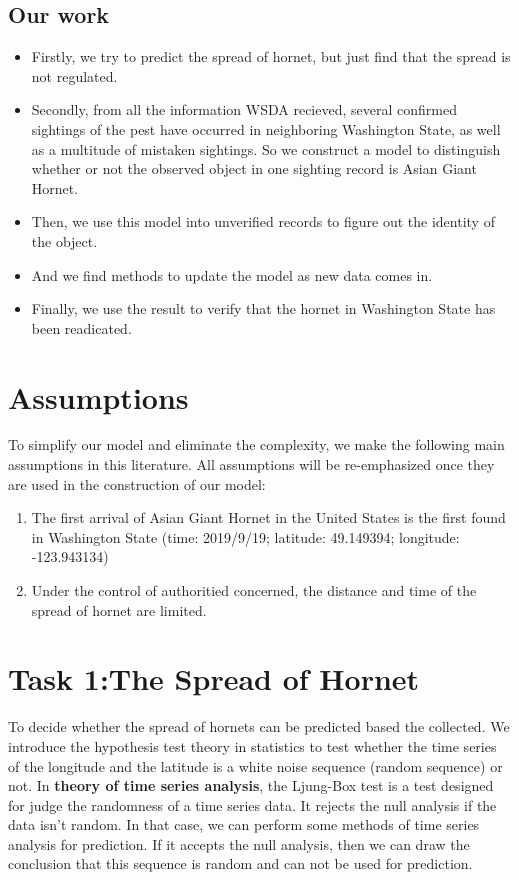 \documentclass[12pt]{article}
\begin{document}
\subsection{Our work}
\begin{itemize}
	\item Firstly, we try to predict the spread of hornet, but just find that the spread is not regulated.
	\item Secondly, from all the information WSDA recieved, several confirmed sightings of the pest have occurred in neighboring Washington State, as well as a multitude of mistaken sightings. So we construct a model to distinguish whether or not the observed object in one sighting record is Asian Giant Hornet.
	\item Then, we use this model into unverified records to figure out the identity of the object.
	\item And we find methods to update the model as new data comes in.
	\item Finally, we use the result to verify that the hornet in Washington State has been readicated.
\end{itemize}



\section{Assumptions}

To simplify our model and eliminate the complexity, we make the following main assumptions in this literature. All assumptions will be re-emphasized once they are used in the construction of our model:
\begin{enumerate}[\bfseries 1.]
	\item The first arrival of Asian Giant Hornet in the United States is the first found in Washington State (time: 2019/9/19; latitude: 49.149394; longitude: -123.943134)
	\item Under the control of authoritied concerned, the distance and time of the spread of hornet are limited.
\end{enumerate}



\section{Task 1:The Spread of Hornet}

To decide whether the spread of hornets can be predicted based the collected. We introduce the hypothesis test theory in statistics to test whether the time series of the longitude and the latitude is a white noise sequence (random sequence) or not. In \textbf{theory of time series analysis}, the Ljung-Box test is a test designed for judge the randomness of a time series data. It rejects  the null analysis if the data isn’t random. In that case, we can perform some methods of time series analysis for prediction. If it accepts the null analysis, then we can draw the conclusion that this sequence is random and can not be used for prediction.
\end{document}
